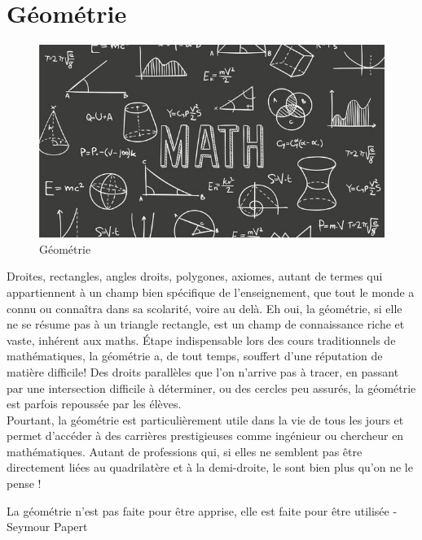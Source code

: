 \documentclass[a4paper]{report}
\begin{document}
\section{Géométrie}
\begin{figure}[!h]
    \centering
    \includegraphics{images/fond-maths.png}
    \caption{Géométrie}
    \label{fig:Géométrie}
\end{figure}
Droites, rectangles, angles droits, polygones, axiomes, autant de termes qui appartiennent à un champ bien spécifique de l'enseignement, que tout le monde a connu ou connaîtra dans sa scolarité, voire au delà. Eh oui, la géométrie, si elle ne se résume pas à un triangle rectangle, est un champ de connaissance riche et vaste, inhérent aux maths.
Étape indispensable lors des cours traditionnels de mathématiques, la géométrie a, de tout temps, souffert d'une réputation de matière difficile! Des droits parallèles que l'on n'arrive pas à tracer, en passant par une intersection difficile à déterminer, ou des cercles peu assurés, la géométrie est parfois repoussée par les élèves.\\
Pourtant, la géométrie est particulièrement utile dans la vie de tous les jours et permet d'accéder à des carrières prestigieuses comme ingénieur ou chercheur en mathématiques. Autant de professions qui, si elles ne semblent pas être directement liées au quadrilatère et à la demi-droite, le sont bien plus qu'on ne le pense !\\
\begin{center}
La géométrie n'est pas faite pour être apprise, elle est faite pour être utilisée - Seymour Papert
\end{center}
\end{document}
